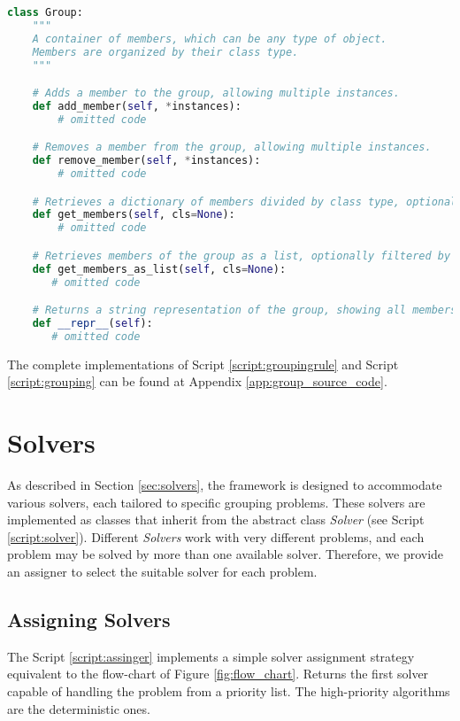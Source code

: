     \begin{lstlisting}[language=Python, caption={\textit{Group} Class. It represents the elements (instances) that are grouped together.}, label={script:grouping}]
class Group:
    """
    A container of members, which can be any type of object.
    Members are organized by their class type.
    """

    # Adds a member to the group, allowing multiple instances.
    def add_member(self, *instances):
        # omitted code

    # Removes a member from the group, allowing multiple instances.
    def remove_member(self, *instances):
        # omitted code

    # Retrieves a dictionary of members divided by class type, optionally filtered by only one class type.
    def get_members(self, cls=None):
        # omitted code

    # Retrieves members of the group as a list, optionally filtered by class type.
    def get_members_as_list(self, cls=None):
       # omitted code

    # Returns a string representation of the group, showing all members and their types.
    def __repr__(self):
       # omitted code
    \end{lstlisting}

    The complete implementations of Script \ref{script:groupingrule} and Script \ref{script:grouping} can be found at Appendix \ref{app:group_source_code}.

    \section{Solvers}
        As described in Section \ref{sec:solvers}, the framework is designed to accommodate various solvers, each tailored to specific grouping problems. These solvers are implemented as classes that inherit from the abstract class \textit{Solver} (see Script \ref{script:solver}).
        Different \textit{Solvers} work with very different problems, and each problem may be solved by more than one available solver.
        Therefore, we provide an assigner to select the suitable solver for each problem.

        \subsection{Assigning Solvers}
            The Script \ref{script:assinger} implements a simple solver assignment strategy equivalent to the flow-chart of Figure \ref{fig:flow_chart}.
            Returns the first solver capable of handling the problem from a priority list.
            The high-priority algorithms are the deterministic ones.
            
